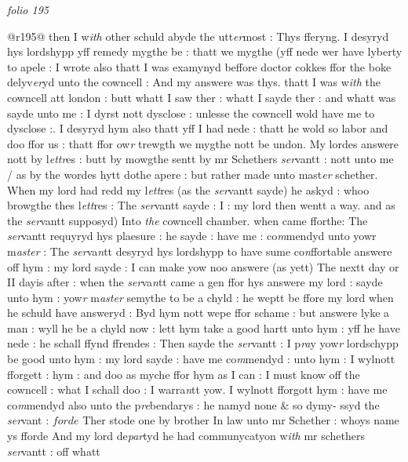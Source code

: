 \documentclass[12pt, a4paper]{book}
\begin{document}

\textit{folio 195}
      				
      				
      				@r195@ then I w\textit{ith} other schuld abyde the utt\textit{er}most : Thys fferyng. I desyryd hys lordshypp yff remedy mygthe be : thatt we mygthe (yff nede wer have  lyberty to apele : I wrote also thatt I was examynyd beffore doctor cokkes ffor the boke delyv\textit{er}yd unto the cowncell : And my answere was thys. thatt I was w\textit{ith} the cowncell att london : butt whatt 
			I saw ther : whatt I sayde ther : and whatt was sayde unto me : I dyrst nott dysclose : unlesse the cowncell wold have me to dysclose :. I desyryd hym also thatt yff I had nede : thatt he wold so labor and doo ffor us : thatt ffor ow\textit{r} trewgth we mygthe nott be undon. My lordes answere nott by l\textit{ettr}es : butt by mowgthe sentt by mr Schethers \textit{ser}vantt : nott unto me / as by the wordes hytt dothe apere : but rather  made unto mast\textit{er} schether. When my lord had redd my l\textit{ett}res (as the \textit{ser}vantt sayde) he askyd : whoo browgthe thes l\textit{ett}res : The \textit{ser}vantt sayde : I : my lord then wentt a way. and as the \textit{ser}vantt supposyd) Into \textit{the} cowncell chamber. when came fforthe: The \textit{ser}vantt requyryd hys plaesure : he sayde : have me : co\textit{m}mendyd unto yowr m\textit{aster} : The \textit{ser}va\textit{n}tt desyryd hys lordshypp to have sume co\textit{n}ffortable answere off hym : my lord sayde : I can make yow noo answere (as yett) The nextt day or II dayis after : when the \textit{ser}va\textit{n}tt came a gen ffor hys answere my lord : sayde unto hym : yow\textit{r} m\textit{aster} semythe to be a chyld : he weptt be ffore my lord when he schuld have answeryd : Byd hym nott 
			wepe ffor schame : but answere lyke a man : wyll he be a chyld now : lett hym take a good hartt unto  hym : yff he have nede : he schall ffynd ffrendes : Then sayde the \textit{ser}vantt : I p\textit{ra}y yow\textit{r }lordschypp be good unto hym : my lord sayde : have me co\textit{m}mendyd : unto hym : I wylnott fforgett : hym : and doo as myche ffor hym as I can : I must know off the cowncell : what I schall doo : I warra\textit{n}tt yow. I wylnott fforgott hym : have me co\textit{m}mendyd also unto the p\textit{re}bendarys : he namyd none \& so dymy- ssyd the \textit{ser}vant : $forde$ Ther stode one by brother In law unto mr Schether : whoys name ys fforde And my lord de\textit{par}tyd he had communycatyon w\textit{ith} mr schethers \textit{ser}vantt : off whatt
      				
\end{document}
